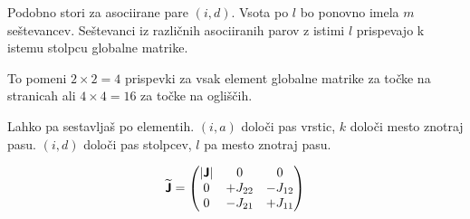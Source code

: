 Podobno stori za asociirane pare $(i, d)$. Vsota po $l$ bo ponovno imela $m$ seštevancev. Seštevanci iz različnih asociiranih parov z istimi $l$ prispevajo k istemu stolpcu globalne matrike.

To pomeni \(2 \times 2 = 4\) prispevki za vsak element globalne matrike za točke na stranicah ali $4 \times 4 = 16$ za točke na ogliščih.

Lahko pa sestavljaš po elementih. $(i, a)$ določi pas vrstic, $k$ določi mesto znotraj pasu. $(i, d)$ določi pas stolpcev, $l$ pa mesto znotraj pasu.

\begin{equation}
   \bm{\mathsf{\widetilde{J}}}
   =
   \begin{pmatrix}
      |\bm{\mathsf{J}}| & 0 & 0 \\
      0 & +J_{22} & -J_{12} \\
      0 & -J_{21} & +J_{11}
   \end{pmatrix}
\end{equation}